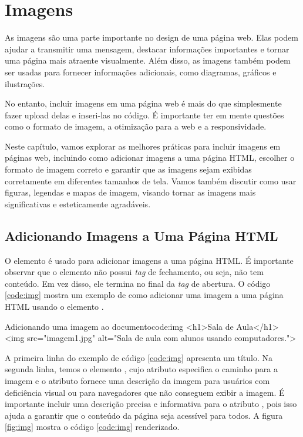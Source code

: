 \chapter{Imagens}

As imagens são uma parte importante no design de uma página web. Elas podem ajudar a transmitir uma mensagem, destacar informações importantes e tornar uma página mais atraente visualmente. Além disso, as imagens também podem ser usadas para fornecer informações adicionais, como diagramas, gráficos e ilustrações.

No entanto, incluir imagens em uma página web é mais do que simplesmente fazer upload delas e inseri-las no código. É importante ter em mente questões como o formato de imagem, a otimização para a web e a responsividade.

Neste capítulo, vamos explorar as melhores práticas para incluir imagens em páginas web, incluindo como adicionar imagens a uma página HTML, escolher o formato de imagem correto e garantir que as imagens sejam exibidas corretamente em diferentes tamanhos de tela. Vamos também discutir como usar figuras, legendas e mapas de imagem, visando tornar as imagens mais significativas e esteticamente agradáveis.

\section{Adicionando Imagens a Uma Página HTML}

O elemento  é usado para adicionar imagens a uma página HTML. É importante observar que o elemento  não possui \textit{tag} de fechamento, ou seja, não tem conteúdo. Em vez disso, ele termina no final da \textit{tag} de abertura. O código \ref{code:img} mostra um exemplo de como adicionar uma imagem a uma página HTML usando o elemento .

\begin{htmlcode}{Adicionando uma imagem ao documento}{code:img}
<h1>Sala de Aula</h1>
<img src="imagem1.jpg" alt="Sala de aula com alunos usando computadores.">
\end{htmlcode}

A primeira linha do exemplo de código \ref{code:img} apresenta um título. Na segunda linha, temos o elemento , cujo atributo  especifica o caminho para a imagem e o atributo  fornece uma descrição da imagem para usuários com deficiência visual ou para navegadores que não conseguem exibir a imagem. É importante incluir uma descrição precisa e informativa para o atributo , pois isso ajuda a garantir que o conteúdo da página seja acessível para todos. A figura \ref{fig:img} mostra o código \ref{code:img} renderizado.

